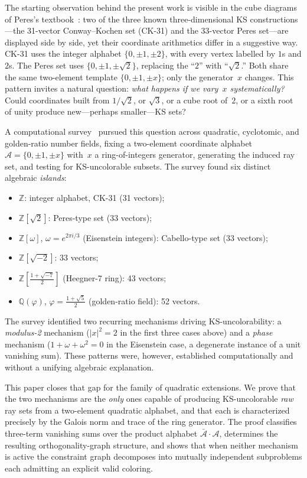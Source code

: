 \documentclass[12pt,a4paper]{article}
\newcommand{\Z}{\mathbb{Z}}
\newcommand{\Q}{\mathbb{Q}}
\begin{document}
The starting observation behind the present work is visible in the
cube diagrams of Peres's textbook~\cite{Peres1993}: two of the three
known three-dimensional KS constructions---the 31-vector
Conway--Kochen set (CK-31) and the 33-vector Peres set---are displayed
side by side, yet their coordinate arithmetics differ in a suggestive
way.  CK-31 uses the integer alphabet $\{0, \pm 1, \pm 2\}$, with
every vertex labelled by $1$s and $2$s.  The Peres set uses
$\{0, \pm 1, \pm\sqrt{2}\}$, replacing the ``$2$'' with ``$\sqrt{2}$.''
Both share the same two-element template $\{0, \pm 1, \pm x\}$; only
the generator~$x$ changes.  This pattern invites a natural question:
\emph{what happens if we vary~$x$ systematically?}  Could coordinates
built from $1/\!\sqrt{2}$, or $\sqrt{3}$, or a cube root of~$2$, or a
sixth root of unity produce new---perhaps smaller---KS sets?

A computational survey~\cite{Kernaghan2026islands} pursued this
question across quadratic, cyclotomic, and golden-ratio number fields,
fixing a two-element coordinate alphabet $\mathcal{A} = \{0, \pm 1,
\pm x\}$ with~$x$ a ring-of-integers generator, generating the
induced ray set, and testing for KS-uncolorable subsets.  The survey
found six distinct algebraic \emph{islands}:
\begin{itemize}
  \item $\Z$: integer alphabet, CK-31 (31 vectors);
  \item $\Z[\sqrt{2}]$: Peres-type set (33 vectors);
  \item $\Z[\omega]$, $\omega = e^{2\pi i/3}$ (Eisenstein integers):
        Cabello-type set (33 vectors);
  \item $\Z[\sqrt{-2}]$: 33 vectors;
  \item $\Z\!\left[\tfrac{1+\sqrt{-7}}{2}\right]$ (Heegner-7 ring): 43
        vectors;
  \item $\Q(\varphi)$, $\varphi = \tfrac{1+\sqrt{5}}{2}$ (golden-ratio
        field): 52 vectors.
\end{itemize}
The survey identified two recurring mechanisms driving KS-uncolorability:
a \emph{modulus-2} mechanism ($|x|^2 = 2$ in the first three cases above)
and a \emph{phase} mechanism ($1 + \omega + \omega^2 = 0$ in the
Eisenstein case, a degenerate instance of a unit vanishing sum).  These
patterns were, however, established computationally and without a
unifying algebraic explanation.

This paper closes that gap for the family of quadratic extensions.  We
prove that the two mechanisms are the \emph{only} ones capable of
producing KS-uncolorable \emph{raw} ray sets from a two-element
quadratic alphabet,
and that each is characterized precisely by the Galois norm and trace of
the ring generator.  The proof classifies
three-term vanishing sums over the product alphabet
$\bar{\mathcal{A}} \cdot \mathcal{A}$, determines the resulting
orthogonality-graph structure, and shows that when neither mechanism is
active the constraint graph decomposes into mutually independent
subproblems each admitting an explicit valid coloring.
\end{document}
